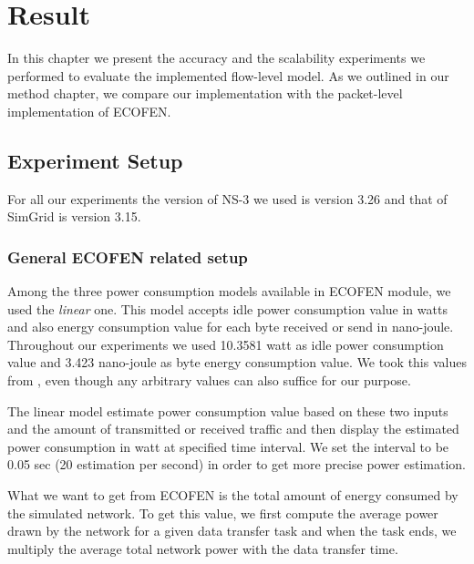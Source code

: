 \chapter{Result}
\label{chapter:evaluation}
In this chapter we present the accuracy and the scalability experiments we performed to evaluate the implemented flow-level model. As we outlined in our method chapter, we compare our implementation with the packet-level implementation of ECOFEN.  
\section{Experiment Setup}
For all our experiments the version of NS-3 we used is version 3.26 and that of SimGrid is version 3.15. 
\subsection{General ECOFEN related setup}
Among the three power consumption models available in ECOFEN module, we used the \emph{linear} one. This model accepts idle power consumption value in watts and also energy consumption value for each byte received or send in nano-joule. Throughout our experiments we used 10.3581 watt as idle power consumption value and 3.423 nano-joule as byte energy consumption value. We took this values from \cite{Sivaraman}, even though any arbitrary values can also suffice for our purpose. 

The linear model estimate power consumption value based on these two inputs and the amount of transmitted or received traffic and then display the estimated power consumption in watt at specified time interval. We set the interval to be 0.05 sec (20 estimation per second) in order to get more precise power estimation. 

What we want to get from ECOFEN is the total amount of energy consumed by the simulated network. To get this value, we first compute the average power drawn by the network for a given data transfer task and when the task ends, we multiply the average total network power with the data transfer time. 

